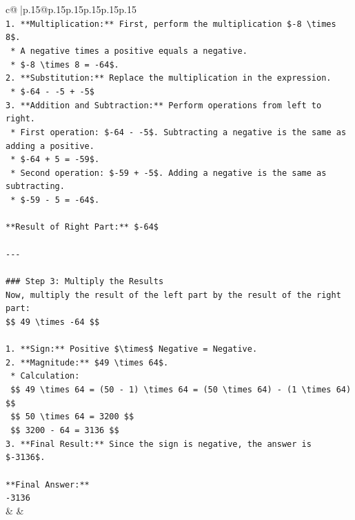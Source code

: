 \documentclass{article}
\begin{document}
{\begin{supertabular}{c@{$\;$}|p{.15\linewidth}@{}p{.15\linewidth}p{.15\linewidth}p{.15\linewidth}p{.15\linewidth}p{.15\linewidth}}
{{{\\ 
\texttt{1.  **Multiplication:** First, perform the multiplication \${-}8 \textbackslash{}times 8\$.} \\
\texttt{    *   A negative times a positive equals a negative.} \\
\texttt{    *   \${-}8 \textbackslash{}times 8 = {-}64\$.} \\
\texttt{2.  **Substitution:** Replace the multiplication in the expression.} \\
\texttt{    *   \${-}64 {-} {-}5 + {-}5\$} \\
\texttt{3.  **Addition and Subtraction:** Perform operations from left to right.} \\
\texttt{    *   First operation: \${-}64 {-} {-}5\$. Subtracting a negative is the same as adding a positive.} \\
\texttt{        *   \${-}64 + 5 = {-}59\$.} \\
\texttt{    *   Second operation: \${-}59 + {-}5\$. Adding a negative is the same as subtracting.} \\
\texttt{        *   \${-}59 {-} 5 = {-}64\$.} \\
\\ 
\texttt{**Result of Right Part:** \${-}64\$} \\
\\ 
\texttt{{-}{-}{-}} \\
\\ 
\texttt{\#\#\# Step 3: Multiply the Results} \\
\texttt{Now, multiply the result of the left part by the result of the right part:} \\
\texttt{\$\$ 49 \textbackslash{}times {-}64 \$\$} \\
\\ 
\texttt{1.  **Sign:** Positive \$\textbackslash{}times\$ Negative = Negative.} \\
\texttt{2.  **Magnitude:** \$49 \textbackslash{}times 64\$.} \\
\texttt{    *   Calculation:} \\
\texttt{        \$\$ 49 \textbackslash{}times 64 = (50 {-} 1) \textbackslash{}times 64 = (50 \textbackslash{}times 64) {-} (1 \textbackslash{}times 64) \$\$} \\
\texttt{        \$\$ 50 \textbackslash{}times 64 = 3200 \$\$} \\
\texttt{        \$\$ 3200 {-} 64 = 3136 \$\$} \\
\texttt{3.  **Final Result:** Since the sign is negative, the answer is \${-}3136\$.} \\
\\ 
\texttt{**Final Answer:**} \\
\texttt{{-}3136} \\
            }
        }
    }
    & & \\ \\


\end{supertabular}}
\end{document}

